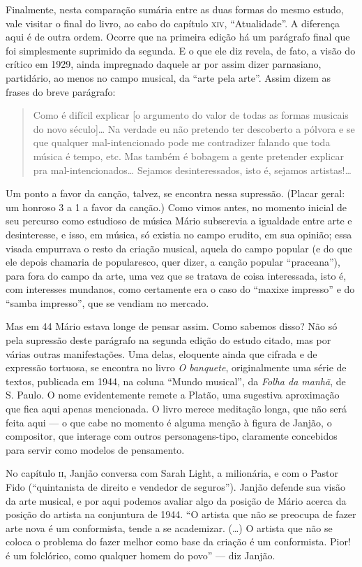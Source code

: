 Finalmente, nesta comparação sumária entre as duas formas do mesmo
estudo, vale visitar o final do livro, ao cabo do capítulo \textsc{xiv},
``Atualidade''. A diferença aqui é de outra ordem. Ocorre que na
primeira edição há um parágrafo final que foi simplesmente suprimido da
segunda. E o que ele diz revela, de fato, a visão do crítico em 1929,
ainda impregnado daquele ar por assim dizer parnasiano, partidário, ao
menos no campo musical, da ``arte pela arte''. Assim dizem as frases do
breve parágrafo:

\begin{quote}
Como é difícil explicar {[}o argumento do valor de todas as formas
musicais do novo século{]}\ldots{} Na verdade eu não pretendo ter descoberto
a pólvora e se que qualquer mal-intencionado pode me contradizer falando
que toda música é tempo, etc. Mas também é bobagem a gente pretender
explicar pra mal-intencionados\ldots{} Sejamos desinteressados, isto é,
sejamos artistas!\ldots{}
\end{quote}

Um ponto a favor da canção, talvez, se encontra nessa supressão. (Placar
geral: um honroso 3 a 1 a favor da canção.) Como vimos antes, no momento
inicial de seu percurso como estudioso de música Mário subscrevia a
igualdade entre arte e desinteresse, e isso, em música, só existia no
campo erudito, em sua opinião; essa visada empurrava o resto da criação
musical, aquela do campo popular (e do que ele depois chamaria de
popularesco, quer dizer, a canção popular ``praceana''), para fora do
campo da arte, uma vez que se tratava de coisa interessada, isto é, com
interesses mundanos, como certamente era o caso do ``maxixe impresso'' e
do ``samba impresso'', que se vendiam no mercado.

Mas em 44 Mário estava longe de pensar assim. Como sabemos disso? Não só
pela supressão deste parágrafo na segunda edição do estudo citado, mas
por várias outras manifestações. Uma delas, eloquente ainda que cifrada
e de expressão tortuosa, se encontra no livro \emph{O banquete},
originalmente uma série de textos, publicada em 1944, na coluna ``Mundo
musical'', da \emph{Folha da manhã}, de S. Paulo. O nome evidentemente
remete a Platão, uma sugestiva aproximação que fica aqui apenas
mencionada. O livro merece meditação longa, que não será feita aqui --- o
que cabe no momento é alguma menção à figura de Janjão, o compositor,
que interage com outros personagens-tipo, claramente concebidos para
servir como modelos de pensamento.

No capítulo \textsc{ii}, Janjão conversa com Sarah Light, a milionária, e com o
Pastor Fido (``quintanista de direito e vendedor de seguros''). Janjão
defende sua visão da arte musical, e por aqui podemos avaliar algo da
posição de Mário acerca da posição do artista na conjuntura de 1944. ``O
artista que não se preocupa de fazer arte nova é um conformista, tende a
se academizar. (\ldots{}) O artista que não se coloca o problema do fazer
melhor como base da criação é um conformista. Pior! é um folclórico,
como qualquer homem do povo'' --- diz Janjão.

